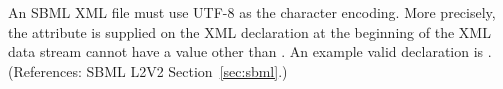 An SBML XML file must use UTF-8 as the character encoding.  More
precisely, the  attribute is supplied on the XML
declaration at the beginning of the XML data stream cannot have a
value other than .  An example valid declaration is
.  (References: SBML
L2V2 Section~\ref{sec:sbml}.)
